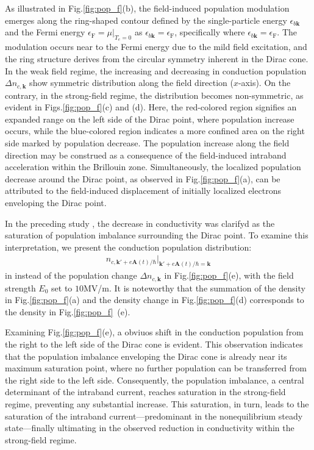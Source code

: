 As illustrated in Fig.\ref{fig:pop_f}(b), the field-induced population modulation emerges along the
ring-shaped contour defined by the single-particle energy $\epsilon_{b\mathbf k}$ and the Fermi
energy $\epsilon_{\mathrm F}=\mu\big |_{T_e=0}$ as $\epsilon_{b\mathbf k}=\epsilon_{\mathrm F}$,
specifically where $\epsilon_{b \mathbf k}=\epsilon_{\mathrm F}$. The modulation occurs near to the Fermi energy due to the mild field excitation, and the ring structure derives from the circular symmetry inherent in the Dirac cone. In the weak field regime, the increasing and decreasing in conduction population $\Delta n_{c,\mathbf{k}}$ show symmetric distribution along the field direction ($x$-axis). On the contrary, in the strong-field regime, the distribution becomes non-symmetric, as evident in Figs.\ref{fig:pop_f}(c) and (d). Here, the red-colored region signifies an expanded range on the left side of the Dirac point, where population increase occurs, while the blue-colored region indicates a more confined area on the right side marked by population decrease. The population increase along the field direction may be construed as a consequence of the field-induced intraband acceleration within the Brillouin zone. Simultaneously, the localized population decrease around the Dirac point, as observed in Fig.\ref{fig:pop_f}(a), can be attributed to the field-induced displacement of initially localized electrons enveloping the Dirac point.

In the preceding study \cite{sato2021nonlinear}, the decrease in conductivity was clarifyd as the
saturation of population imbalance surrounding the Dirac point. To examine this interpretation,
we present the conduction population distribution:
\begin{align}
	n_{c,\mathbf k'+e\mathbf A(t)/\hbar}\big |_{\mathbf k'+e\mathbf A(t)/\hbar=\mathbf k}
\end{align}
in instead of the population change $\Delta n_{c,\mathbf{k}}$ in Fig.\ref{fig:pop_f}(e), with the field strength $E_0$ set to $10$MV/m. It is noteworthy that the summation of the density in Fig.\ref{fig:pop_f}(a) and the density change in Fig.\ref{fig:pop_f}(d) corresponds to the density in Fig.\ref{fig:pop_f}~(e).

Examining Fig.\ref{fig:pop_f}(e), a obviuos shift in the conduction population from the right to the left side of the Dirac cone is evident. This observation indicates that the population imbalance enveloping the Dirac cone is already near its maximum saturation point, where no further population can be transferred from the right side to the left side. Consequently, the population imbalance, a central determinant of the intraband current, reaches saturation in the strong-field regime, preventing any substantial increase. This saturation, in turn, leads to the saturation of the intraband current—predominant in the nonequilibrium steady state—finally ultimating in the observed reduction in conductivity within the strong-field regime.

